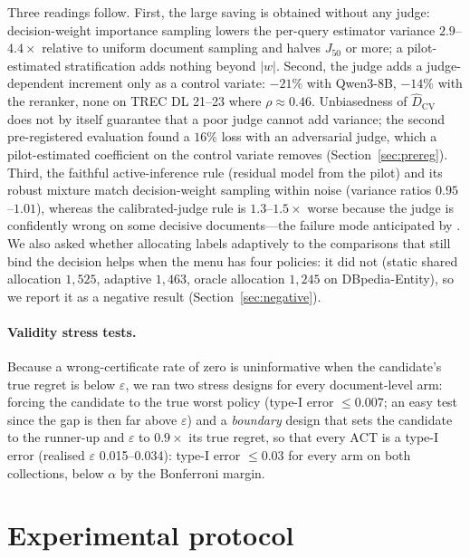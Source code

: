 \documentclass{article}
\newcommand{\eps}{\varepsilon}
\newcommand{\ACT}{\mathrm{ACT}}
\newcommand{\Jfifty}{J_{50}}
\begin{document}
Three readings follow. First, the large saving is obtained without any judge: decision-weight importance sampling lowers the per-query estimator variance $2.9$--$4.4\times$ relative to uniform document sampling and halves $\Jfifty$ or more; a pilot-estimated stratification adds nothing beyond $|w|$. Second, the judge adds a judge-dependent increment only as a control variate: $-21\%$ with Qwen3-8B, $-14\%$ with the reranker, none on TREC DL 21--23 where $\rho\approx0.46$. Unbiasedness of $\hat D_{\mathrm{CV}}$ does not by itself guarantee that a poor judge cannot add variance; the second pre-registered evaluation found a $16\%$ loss with an adversarial judge, which a pilot-estimated coefficient on the control variate removes (Section~\ref{sec:prereg}). Third, the faithful active-inference rule (residual model from the pilot) and its robust mixture match decision-weight sampling within noise (variance ratios $0.95$--$1.01$), whereas the calibrated-judge rule is $1.3$--$1.5\times$ worse because the judge is confidently wrong on some decisive documents---the failure mode anticipated by \citet{li2025robust}. We also asked whether allocating labels adaptively to the comparisons that still bind the decision helps when the menu has four policies: it did not (static shared allocation $1{,}525$, adaptive $1{,}463$, oracle allocation $1{,}245$ on DBpedia-Entity), so we report it as a negative result (Section~\ref{sec:negative}).

\paragraph{Validity stress tests.} Because a wrong-certificate rate of zero is uninformative when the candidate's true regret is below $\eps$, we ran two stress designs for every document-level arm: forcing the candidate to the true worst policy (type-I error $\le0.007$; an easy test since the gap is then far above $\eps$) and a \emph{boundary} design that sets the candidate to the runner-up and $\eps$ to $0.9\times$ its true regret, so that every $\ACT$ is a type-I error (realised $\eps$ 0.015--0.034): type-I error $\le0.03$ for every arm on both collections, below $\alpha$ by the Bonferroni margin.

\section{Experimental protocol}\label{sec:protocol}
\end{document}
